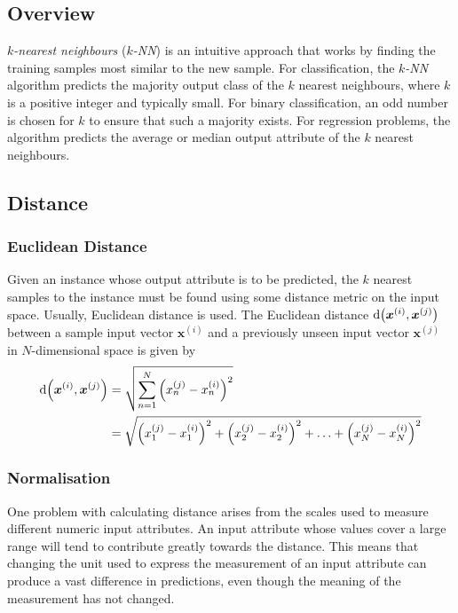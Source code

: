 \subsection{Overview}

\( k \)\emph{-nearest neighbours} (\( k \)\emph{-NN}) is an intuitive approach that works by finding the training samples most similar to the new sample.
For classification, the \( k \)\emph{-NN} algorithm predicts the majority output class of the \( k \) nearest neighbours, where \( k \) is a positive integer and typically small.
For binary classification, an odd number is chosen for \( k \) to ensure that such a majority exists.
For regression problems, the algorithm predicts the average or median output attribute of the \( k \) nearest neighbours.

\subsection{Distance}

\subsubsection{Euclidean Distance}

Given an instance whose output attribute is to be predicted, the \( k \) nearest samples to the instance must be found using some distance metric on the input space.
Usually, Euclidean distance is used.
The Euclidean distance \( \mathrm{d}\!\left( \boldsymbol{x}^{(i)} ,\boldsymbol{x}^{(j)} \right) \) between a sample input vector \( \boldsymbol{x}^{(i)} \) and a previously unseen input vector \( \boldsymbol{x}^{(j)} \) in \( N \)-dimensional space is given by
\begin{equation*}
  \begin{aligned}
    \mathrm{d}\!\left( \boldsymbol{x}^{(i)} ,\boldsymbol{x}^{(j)} \right) &= \sqrt{\sum_{n=1}^{N} \left( x_{n}^{(j)} - x_{n}^{(i)} \right)^{2}} \\
    &= \sqrt{\left( x_{1}^{(j)} - x_{1}^{(i)} \right)^{2} + \left( x_{2}^{(j)} - x_{2}^{(i)} \right)^{2} + \ldots + \left( x_{N}^{(j)} - x_{N}^{(i)} \right)^{2}}
  \end{aligned}
\end{equation*}

\subsubsection{Normalisation}

One problem with calculating distance arises from the scales used to measure different numeric input attributes.
An input attribute whose values cover a large range will tend to contribute greatly towards the distance.
This means that changing the unit used to express the measurement of an input attribute can produce a vast difference in predictions, even though the meaning of the measurement has not changed.

